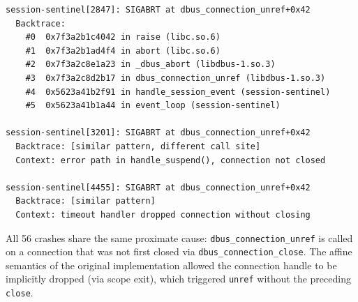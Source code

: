 \documentclass[11pt,a4paper]{article}
\begin{document}
\begin{lstlisting}[basicstyle=\ttfamily\scriptsize, frame=single, numbers=none]
session-sentinel[2847]: SIGABRT at dbus_connection_unref+0x42
  Backtrace:
    #0  0x7f3a2b1c4042 in raise (libc.so.6)
    #1  0x7f3a2b1ad4f4 in abort (libc.so.6)
    #2  0x7f3a2c8e1a23 in _dbus_abort (libdbus-1.so.3)
    #3  0x7f3a2c8d2b17 in dbus_connection_unref (libdbus-1.so.3)
    #4  0x5623a41b2f91 in handle_session_event (session-sentinel)
    #5  0x5623a41b1a44 in event_loop (session-sentinel)

session-sentinel[3201]: SIGABRT at dbus_connection_unref+0x42
  Backtrace: [similar pattern, different call site]
  Context: error path in handle_suspend(), connection not closed

session-sentinel[4455]: SIGABRT at dbus_connection_unref+0x42
  Backtrace: [similar pattern]
  Context: timeout handler dropped connection without closing
\end{lstlisting}

All 56 crashes share the same proximate cause:
\lstinline{dbus_connection_unref} is called on a connection that was not first
closed via \lstinline{dbus_connection_close}. The affine semantics of the
original implementation allowed the connection handle to be implicitly dropped
(via scope exit), which triggered \lstinline{unref} without the preceding
\lstinline{close}.
\end{document}
